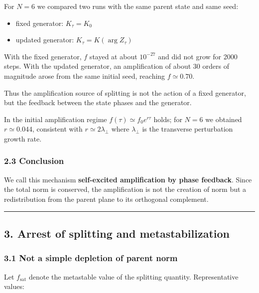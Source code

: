 \documentclass[
  a4paper,
]{article}
\providecommand{\tightlist}{%
  \setlength{\itemsep}{0pt}\setlength{\parskip}{0pt}}
\begin{document}
For \(N=6\) we compared two runs with the same parent state and same
seed:

\begin{itemize}
\tightlist
\item
  fixed generator: \(K_\tau=K_0\)
\item
  updated generator: \(K_\tau=K(\arg Z_\tau)\)
\end{itemize}

With the fixed generator, \(f\) stayed at about \(10^{-27}\) and did not
grow for 2000 steps. With the updated generator, an amplification of
about 30 orders of magnitude arose from the same initial seed, reaching
\(f\simeq0.70\).

Thus the amplification source of splitting is not the action of a fixed
generator, but the feedback between the state phases and the generator.

In the initial amplification regime \(f(\tau)\simeq f_0 e^{r\tau}\)
holds; for \(N=6\) we obtained \(r\simeq0.044\), consistent with
\(r\simeq2\lambda_\perp\) where \(\lambda_\perp\) is the transverse
perturbation growth rate.

\subsubsection{2.3 Conclusion}\label{conclusion}

We call this mechanism \textbf{self-excited amplification by phase
feedback}. Since the total norm is conserved, the amplification is not
the creation of norm but a redistribution from the parent plane to its
orthogonal complement.

\begin{center}\rule{0.5\linewidth}{0.5pt}\end{center}

\subsection{3. Arrest of splitting and
metastabilization}\label{arrest-of-splitting-and-metastabilization}

\subsubsection{3.1 Not a simple depletion of parent
norm}\label{not-a-simple-depletion-of-parent-norm}

Let \(f_{\mathrm{sat}}\) denote the metastable value of the splitting
quantity. Representative values:
\end{document}
